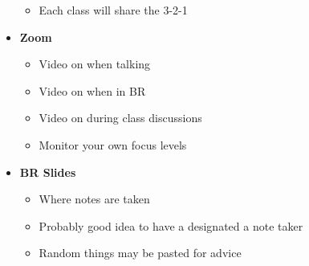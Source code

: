 \documentclass[letterpaper]{article}
\begin{document}
\begin{itemize}
\begin{itemize}
\item Each class will share the 3-2-1
\end{itemize}

\item \textbf{Zoom}

\begin{itemize}
\item Video on when talking
\item Video on when in BR
\item Video on during class discussions
\item Monitor your own focus levels
\end{itemize}

\item \textbf{BR Slides}

\begin{itemize}
\item Where notes are taken
\item Probably good idea to have a designated a note taker
\item Random things may be pasted for advice
\end{itemize}
\end{itemize}
\end{document}
